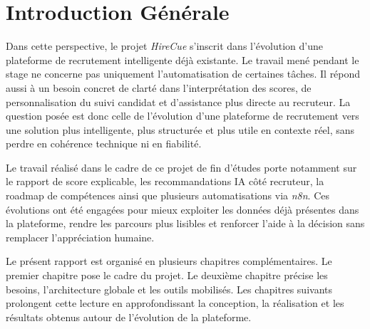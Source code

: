 \documentclass[12pt,a4paper]{report}
\begin{document}
\chapter*{Introduction G\'en\'erale}
Dans cette perspective, le projet \textit{HireCue} s'inscrit dans l'\'evolution d'une plateforme de recrutement intelligente d\'ej\`a existante. Le travail men\'e pendant le stage ne concerne pas uniquement l'automatisation de certaines t\^aches. Il r\'epond aussi \`a un besoin concret de clart\'e dans l'interpr\'etation des scores, de personnalisation du suivi candidat et d'assistance plus directe au recruteur. La question pos\'ee est donc celle de l'\'evolution d'une plateforme de recrutement vers une solution plus intelligente, plus structur\'ee et plus utile en contexte r\'eel, sans perdre en coh\'erence technique ni en fiabilit\'e.

Le travail r\'ealis\'e dans le cadre de ce projet de fin d'\'etudes porte notamment sur le rapport de score explicable, les recommandations IA c\^ot\'e recruteur, la roadmap de comp\'etences ainsi que plusieurs automatisations via \textit{n8n}. Ces \'evolutions ont \'et\'e engag\'ees pour mieux exploiter les donn\'ees d\'ej\`a pr\'esentes dans la plateforme, rendre les parcours plus lisibles et renforcer l'aide \`a la d\'ecision sans remplacer l'appr\'eciation humaine.

Le pr\'esent rapport est organis\'e en plusieurs chapitres compl\'ementaires. Le premier chapitre pose le cadre du projet. Le deuxi\`eme chapitre pr\'ecise les besoins, l'architecture globale et les outils mobilis\'es. Les chapitres suivants prolongent cette lecture en approfondissant la conception, la r\'ealisation et les r\'esultats obtenus autour de l'\'evolution de la plateforme.

\newpage
{}
\setcounter{page}{1}
\hypersetup{pageanchor=true}
\pagestyle{hirecuepages}







\end{document}
